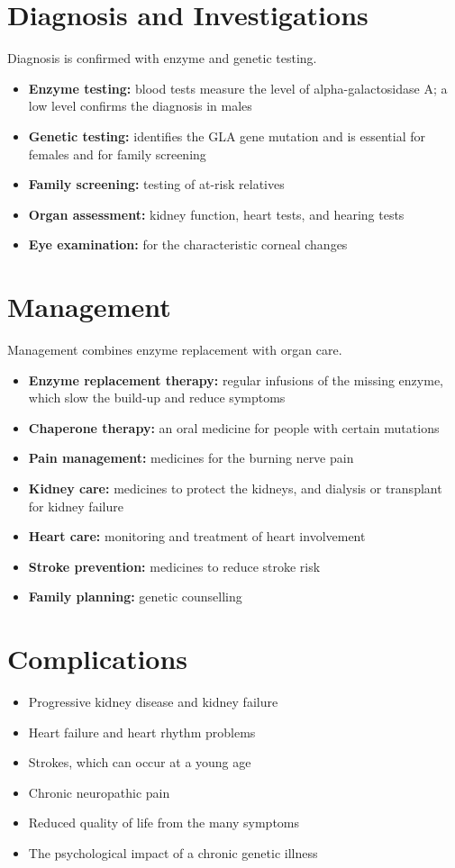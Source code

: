 \section*{Diagnosis and Investigations}
Diagnosis is confirmed with enzyme and genetic testing.
\begin{itemize}
    \item \textbf{Enzyme testing:} blood tests measure the level of alpha-galactosidase A; a low level confirms the diagnosis in males
    \item \textbf{Genetic testing:} identifies the GLA gene mutation and is essential for females and for family screening
    \item \textbf{Family screening:} testing of at-risk relatives
    \item \textbf{Organ assessment:} kidney function, heart tests, and hearing tests
    \item \textbf{Eye examination:} for the characteristic corneal changes
\end{itemize}

\section*{Management}
Management combines enzyme replacement with organ care.
\begin{itemize}
    \item \textbf{Enzyme replacement therapy:} regular infusions of the missing enzyme, which slow the build-up and reduce symptoms
    \item \textbf{Chaperone therapy:} an oral medicine for people with certain mutations
    \item \textbf{Pain management:} medicines for the burning nerve pain
    \item \textbf{Kidney care:} medicines to protect the kidneys, and dialysis or transplant for kidney failure
    \item \textbf{Heart care:} monitoring and treatment of heart involvement
    \item \textbf{Stroke prevention:} medicines to reduce stroke risk
    \item \textbf{Family planning:} genetic counselling
\end{itemize}

\section*{Complications}
\begin{itemize}
    \item Progressive kidney disease and kidney failure
    \item Heart failure and heart rhythm problems
    \item Strokes, which can occur at a young age
    \item Chronic neuropathic pain
    \item Reduced quality of life from the many symptoms
    \item The psychological impact of a chronic genetic illness
\end{itemize}

